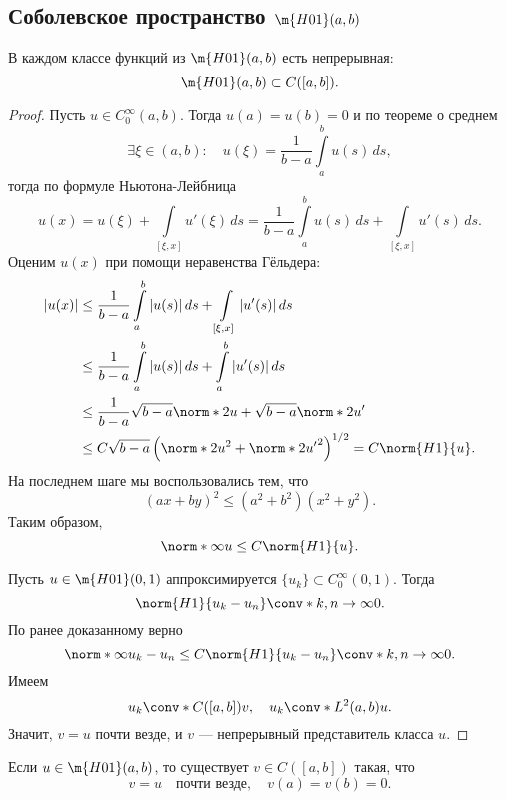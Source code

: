 \subsection{Соболевское пространство $\m{H01}(a,b)$}

\begin{theorem} В каждом классе функций из $\m{H01}(a,b)$ есть непрерывная:
 $$ \m{H01}(a,b) \subset C([a,b]) .$$
\end{theorem}
\begin{proof}
Пусть $u \in C_0^\infty (a,b)$. Тогда $u(a) = u(b) = 0$ и по теореме о среднем
$$ \exists \xi \in (a,b): \quad u(\xi) = \frac{1}{b-a} \int \limits_a^b u(s) \, ds,$$
тогда по формуле Ньютона-Лейбница
$$ u(x) = u(\xi) + \int \limits_{[\xi, x]} u'(\xi) \, ds = \frac {1} {b-a} \int \limits_a^b u(s) \, ds + \int \limits_{[\xi, x]} u'(s) \, ds.$$
Оценим $u(x)$ при помощи неравенства Гёльдера:
\begin{align*}
|u(x)| &\leq \frac {1} {b-a} \int \limits_a^b |u(s)| \, ds + \int \limits_{[\xi, x]} |u'(s)| \, ds \\
&\leq \frac {1} {b-a} \int \limits_a^b |u(s)| \, ds + \int \limits_a^b |u'(s)| \, ds \\
&\leq \frac {1} {b-a} \sqrt{b-a} \norm*{2}{u} + \sqrt{b-a} \norm*{2}{u'} \\
&\leq C \sqrt{b-a} \left( \norm*{2}{u}^2 + \norm*{2}{u'}^2 \right)^{1/2} = C \norm{H1}{u}.
\end{align*}
На последнем шаге мы воспользовались тем, что
$$ (ax + by)^2 \leq (a^2 + b^2) (x^2 + y^2).$$
Таким образом,
$$ \norm*{\infty}{u} \leq C \norm{H1}{u}.$$

Пусть $u \in \m{H01} (0,1)$ аппроксимируется $\{ u_k \} \subset C_0^\infty (0,1)$. Тогда
$$ \norm{H1}{u_k - u_n} \conv*{}{k,n \to \infty} 0.$$
По ранее доказанному верно 
$$ \norm*{\infty}{u_k - u_n} \leq C \norm{H1}{u_k - u_n} \conv*{}{k,n \to \infty} 0.$$
Имеем 
$$ u_k \conv*{C([a,b])}{} v, \quad u_k \conv*{L^2(a,b)}{} u.$$
Значит, $v = u$ почти везде, и $v$ --- непрерывный представитель класса $u$.  

\end{proof}


\begin{corollary} Если $u \in \m{H01} (a,b)$, то существует $v \in C([a,b])$ такая, что
$$ v = u \quad \text{почти везде}, \quad v(a) = v(b) = 0.$$
\end{corollary}

